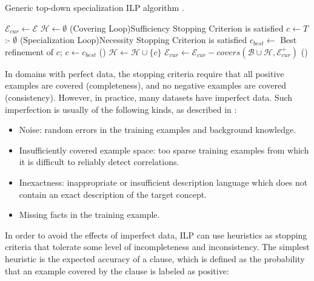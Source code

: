 \begin{algorithm}[!h]
  \caption{Generic top-down specialization ILP algorithm \citep{DBLP:journals/ml/LavracD96}.}

  $\mathcal{E}_{cur} \leftarrow \mathcal{E}$ \;
  $\mathcal{H} \leftarrow \emptyset$ \;
  \Repeat(Covering Loop){Sufficiency Stopping Criterion is satisfied} {
    $c \leftarrow T$ :- $\emptyset$ \;
    \Repeat(Specialization Loop){Necessity Stopping Criterion is satisfied} {
      $c_{best} \leftarrow$ Best refinement of $c$;
      $c \leftarrow c_{best}$ \;
    } ()
    $\mathcal{H} \leftarrow \mathcal{H} \cup \{c\}$ \;
    $\mathcal{E}_{cur} \leftarrow \mathcal{E}_{cur} - covers(\mathcal{B} \cup \mathcal{H},\mathcal{E}_{cur}^{+})$ \;
  } ()
 \label{alg:topDownILP}
\end{algorithm}

In domains with perfect data, the stopping criteria require that all positive examples are covered (completeness), and
no negative examples are covered (consistency). However, in practice, many datasets have imperfect data. Such
imperfection is usually of the following kinds, as described in \citet{DBLP:conf/aii/LavracD92}:

\begin{itemize}
  \item Noise: random errors in the training examples and background knowledge.
  \item Insufficiently covered example space: too sparse training examples from which it is difficult to reliably
detect correlations.
  \item Inexactness: inappropriate or insufficient description language which does not contain an exact description of
the target concept.
  \item Missing facts in the training example.
\end{itemize}

In order to avoid the effects of imperfect data, ILP can use heuristics as stopping criteria that tolerate
some level of incompleteness and inconsistency. The simplest heuristic is the expected accuracy of a clause, which is
defined as the probability that an example covered by the clause is labeled as positive\citep{DBLP:conf/aii/LavracD92}:

